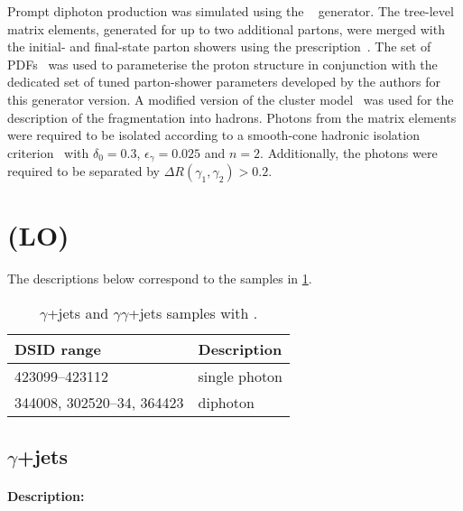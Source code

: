 Prompt diphoton production was simulated using the \SHERPA[2.1]~\cite{Bothmann:2019yzt}
generator. The tree-level matrix elements, generated for up to two
additional partons, were merged with the initial- and final-state parton showers using the
\MEPSatLO prescription~\cite{Hoeche:2009rj}. The \CT[10nlo] set of PDFs~\cite{Lai:2010vv} was
used to parameterise the proton structure in conjunction with the dedicated set of tuned
parton-shower parameters developed by the \SHERPA authors for this generator version. A
modified version of the cluster model~\cite{Winter:2003tt} was used
for the description of the fragmentation into hadrons. Photons from the matrix elements were
required to be isolated according to a smooth-cone hadronic isolation criterion~\cite{Frixione:1998jh}
with \(\delta_0=0.3\), \(\epsilon_{\gamma}=0.025\) and \(n=2\). Additionally, the photons were
required to be separated by \(\Delta R(\gamma_1,\gamma_2) > 0.2\).


\section[Pythia (LO)]{\PYTHIA (LO)}

The descriptions below correspond to the samples in \cref{tab:gammajets-pythia-lo}.

\begin{table}[!htbp]
  \caption{\(\gamma\)+jets and  \(\gamma\gamma\)+jets samples with \PYTHIA.}%
  \label{tab:gammajets-pythia-lo}
  \centering
  \begin{tabular}{l l}
    \toprule
    DSID range & Description \\
    \midrule
    423099--423112 & single photon \\
    344008, 302520--34, 364423 & diphoton \\
    \bottomrule
  \end{tabular}
\end{table}


\subsection[y+jets]{\(\gamma\)+jets}

\paragraph{Description:}

